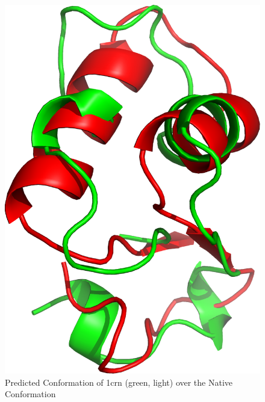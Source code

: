 \begin{figure}[ht]
    \centering
    \includegraphics[width=0.9\linewidth]{Figuras/prots/1crn_render.png}
    \caption{Predicted Conformation of 1crn (green, light) over the Native Conformation}
    \label{fig:1crn-visual}
\end{figure}

